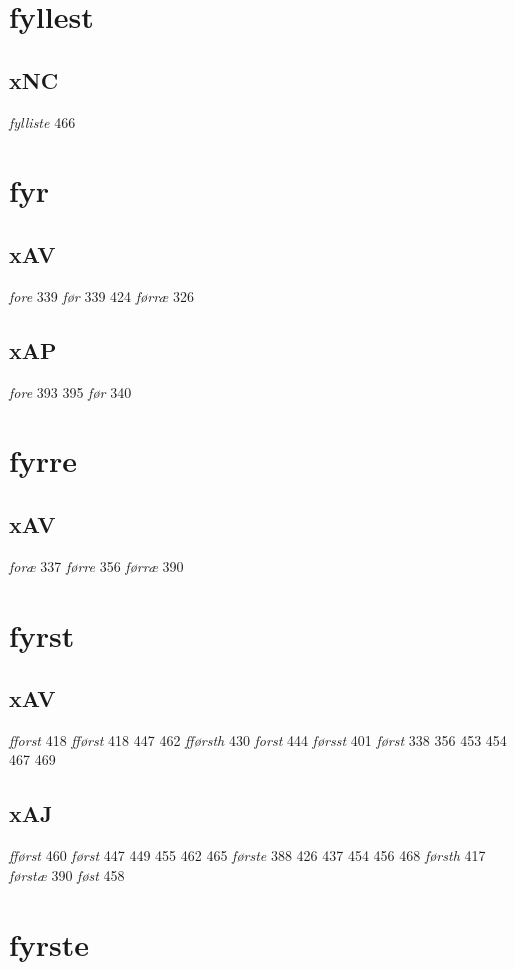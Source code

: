 \documentclass[a4paper,twocolumn]{article}
\begin{document}
\section{fyllest}
\label{sec:orgf91a278}
\subsection{xNC}
\label{sec:orga71549a}
\emph{fylliste} 466 
\section{fyr}
\label{sec:orgfb8a845}
\subsection{xAV}
\label{sec:orge2d5c4a}
\emph{fore} 339 \emph{før} 339 424 \emph{førræ} 326 
\subsection{xAP}
\label{sec:orgaac15c2}
\emph{fore} 393 395 \emph{før} 340 
\section{fyrre}
\label{sec:orgded37bf}
\subsection{xAV}
\label{sec:org20178d5}
\emph{foræ} 337 \emph{førre} 356 \emph{førræ} 390 
\section{fyrst}
\label{sec:org361a381}
\subsection{xAV}
\label{sec:org6ef6387}
\emph{fforst} 418 \emph{fførst} 418 447 462 \emph{fførsth} 430 \emph{forst} 444 \emph{førsst} 401 \emph{først} 338 356 453 454 467 469 
\subsection{xAJ}
\label{sec:orgb9787e3}
\emph{fførst} 460 \emph{først} 447 449 455 462 465 \emph{første} 388 426 437 454 456 468 \emph{førsth} 417 \emph{førstæ} 390 \emph{føst} 458 
\section{fyrste}
\label{sec:orgdf031c8}
\end{document}
